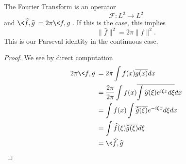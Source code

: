 \begin{plancherel}
The Fourier Transform is an operator
\begin{equation}
\mathcal{F}:L^2\to L^2
\end{equation}
and $\<\widehat{f},\widehat{g}\>=2\pi\<f,g\>$. If this is
the case, this implies 
\begin{equation}
\|\widehat{f}\|^{2} = 2\pi\|f\|^2.
\end{equation}
This is our Parseval identity in the continuous
case.
\end{plancherel}
\begin{proof}
We see by direct computation
\begin{align*}
2\pi\<f,g\> &= 2\pi\int f(x)\overline{g(x)}dx\\
&=\frac{2\pi}{2\pi}\int
f(x)\overline{\int\widehat{g}(\xi)e^{i\xi x}d\xi}dx\\
&=\int f(x)\int\overline{\widehat{g}(\xi)}e^{-i\xi x}d\xi dx\\
&= \int \widehat{f}(\xi)\overline{\widehat{g}(\xi)}d\xi\\
&=\<\widehat{f},\widehat{g}\>
\end{align*}
\end{proof}
